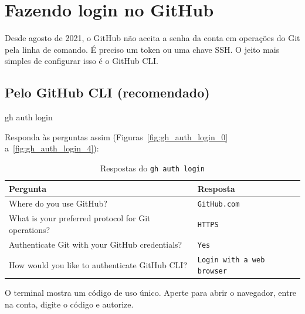 \section{Fazendo login no GitHub}

Desde agosto de 2021, o GitHub não aceita a senha da conta em operações do Git
pela linha de comando. É preciso um token ou uma chave SSH. O jeito mais
simples de configurar isso é o GitHub CLI.

\subsection{Pelo GitHub CLI (recomendado)}

\begin{bashcode}
gh auth login
\end{bashcode}

Responda às perguntas assim
(Figuras~\ref{fig:gh_auth_login_0} a~\ref{fig:gh_auth_login_4}):

\begin{table}[H]
  \centering
  \caption{Respostas do \texttt{gh auth login}}
  \label{tab:gh_auth}
  \begin{tabularx}{\textwidth}{@{}X l@{}}
    \toprule
    \textbf{Pergunta} & \textbf{Resposta} \\
    \midrule
    Where do you use GitHub? & \texttt{GitHub.com} \\
    What is your preferred protocol for Git operations? & \texttt{HTTPS} \\
    Authenticate Git with your GitHub credentials? & \texttt{Yes} \\
    How would you like to authenticate GitHub CLI? & \texttt{Login with a web browser} \\
    \bottomrule
  \end{tabularx}
\end{table}

O terminal mostra um código de uso único. Aperte  para abrir o
navegador, entre na conta, digite o código e autorize.

